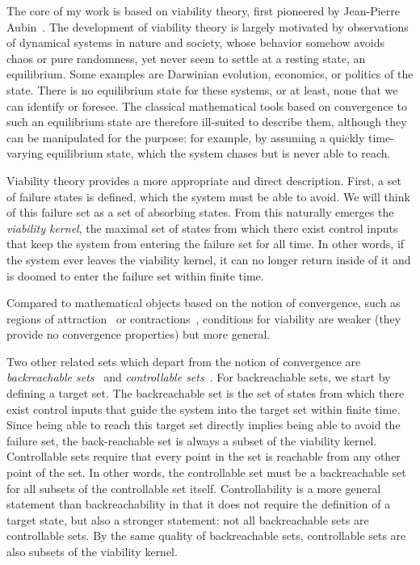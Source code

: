 The core of my work is based on viability theory, first pioneered by Jean-Pierre Aubin~\cite{aubin2011viability}. The development of viability theory is largely motivated by observations of dynamical systems in nature and society, whose behavior somehow avoids chaos or pure randomness, yet never seem to settle at a resting state, an equilibrium.
Some examples are Darwinian evolution, economics, or politics of the state. There is no equilibrium state for these systems, or at least, none that we can identify or foresee.
The classical mathematical tools based on convergence to such an equilibrium state are therefore ill-suited to describe them, although they can be manipulated for the purpose: for example, by assuming a quickly time-varying equilibrium state, which the system chases but is never able to reach. \par
Viability theory provides a more appropriate and direct description. First, a set of failure states is defined, which the system must be able to avoid. We will think of this failure set as a set of absorbing states. From this naturally emerges the \emph{viability kernel}, the maximal set of states from which there exist control inputs that keep the system from entering the failure set for all time. In other words, if the system ever leaves the viability kernel, it can no longer return inside of it and is doomed to enter the failure set within finite time. \par
Compared to mathematical objects based on the notion of convergence, such as regions of attraction~\cite[(cf. 6.4)]{strogatz2018nonlinear} or contractions~\cite{bazzi2018stability}, conditions for viability are weaker (they provide no convergence properties) but more general. \par
Two other related sets which depart from the notion of convergence are \emph{backreachable sets}~\cite{bansal2017hamilton} and \emph{controllable sets}~\cite{zaytsev2018boundaries}. For backreachable sets, we start by defining a target set.
The backreachable set is the set of states from which there exist control inputs that guide the system into the target set within finite time.
Since being able to reach this target set directly implies being able to avoid the failure set, the back-reachable set is always a subset of the viability kernel.
Controllable sets require that every point in the set is reachable from any other point of the set. In other words, the controllable set must be a backreachable set for all subsets of the controllable set itself. Controllability is a more general statement than backreachability in that it does not require the definition of a target state, but also a stronger statement: not all backreachable sets are controllable sets. By the same quality of backreachable sets, controllable sets are also subsets of the viability kernel. \par
